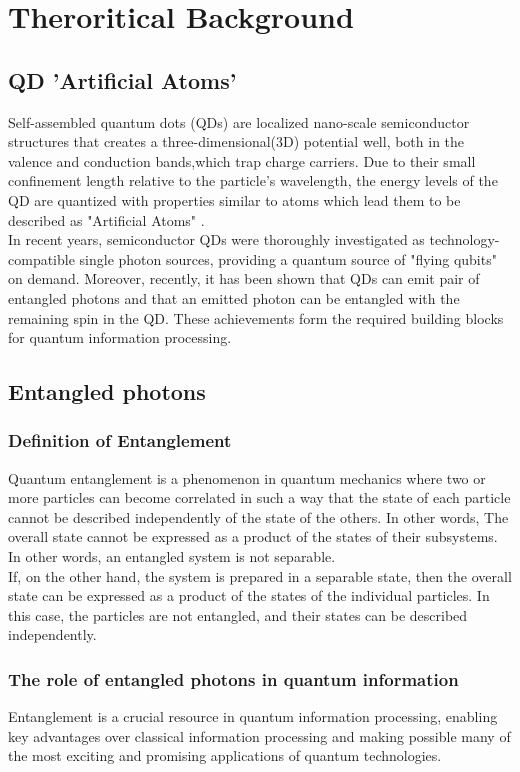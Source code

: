 \section{Theroritical Background}
\subsection{QD 'Artificial Atoms'}
Self-assembled quantum dots (QDs) are localized nano-scale semiconductor structures that creates a three-dimensional(3D) potential well, both in the valence and conduction bands,which trap charge carriers. Due to their small confinement length relative to the particle's wavelength, the energy levels of the QD are quantized with properties similar to atoms which lead them to be described as "Artificial Atoms" \cite{Kastner1993}. \\
In recent years, semiconductor QDs were thoroughly investigated as technology-compatible single photon sources, providing a quantum source of "flying qubits" on demand.\cite{Dekel2000,Michler2000,Michler2000_1,Yuan2002} Moreover, recently, it has been shown that QDs can emit pair of entangled photons \cite{Akopian2006,Hafenbrak2007} and that an emitted photon can be entangled with the remaining spin in the QD. \cite{Pelk2012,Schaibley2013,Gao2012} These achievements form the required building blocks for quantum information processing. \cite{DiVincenzo1998,Duan2001}\\
\subsection{Entangled photons}
\subsubsection{Definition of Entanglement}
Quantum entanglement is a phenomenon in quantum mechanics where two or more particles can become correlated in such a way that the state of each particle cannot be described independently of the state of the others. 
 In other words, The overall state cannot be expressed as a product of the states of their subsystems. In other words, an entangled system is not separable.\\
 If, on the other hand, the system is prepared in a separable state, then the overall state can be expressed as a product of the states of the individual particles. In this case, the particles are not entangled, and their states can be described independently.
\subsubsection{The role of entangled photons in quantum information}
Entanglement is a crucial resource in quantum information processing, enabling key advantages over classical information processing and making possible many of the most exciting and promising applications of quantum technologies.

